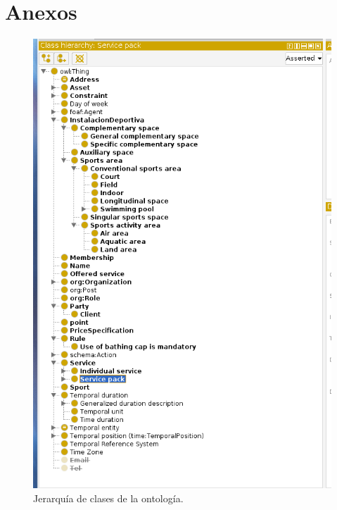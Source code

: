\documentclass[a4paper,12pt]{article}
\begin{document}
	\newpage
	\section*{Anexos}
	
	\begin{figure}[H]
		\centering
		\includegraphics[height=\textheight]{include/classes.png}
		\caption{Jerarquía de clases de la ontología.}
	\end{figure}
\end{document}
